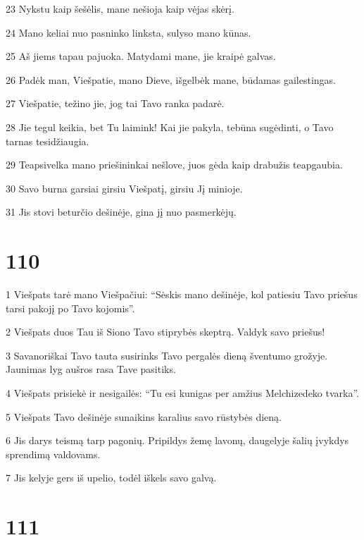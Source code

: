 \par 23 Nykstu kaip šešėlis, mane nešioja kaip vėjas skėrį. 
\par 24 Mano keliai nuo pasninko linksta, sulyso mano kūnas. 
\par 25 Aš jiems tapau pajuoka. Matydami mane, jie kraipė galvas. 
\par 26 Padėk man, Viešpatie, mano Dieve, išgelbėk mane, būdamas gailestingas. 
\par 27 Viešpatie, težino jie, jog tai Tavo ranka padarė. 
\par 28 Jie tegul keikia, bet Tu laimink! Kai jie pakyla, tebūna sugėdinti, o Tavo tarnas tesidžiaugia. 
\par 29 Teapsivelka mano priešininkai nešlove, juos gėda kaip drabužis teapgaubia. 
\par 30 Savo burna garsiai girsiu Viešpatį, girsiu Jį minioje. 
\par 31 Jis stovi beturčio dešinėje, gina jį nuo pasmerkėjų.


\chapter{110}


\par 1 Viešpats tarė mano Viešpačiui: “Sėskis mano dešinėje, kol patiesiu Tavo priešus tarsi pakojį po Tavo kojomis”. 
\par 2 Viešpats duos Tau iš Siono Tavo stiprybės skeptrą. Valdyk savo priešus! 
\par 3 Savanoriškai Tavo tauta susirinks Tavo pergalės dieną šventumo grožyje. Jaunimas lyg aušros rasa Tave pasitiks. 
\par 4 Viešpats prisiekė ir nesigailės: “Tu esi kunigas per amžius Melchizedeko tvarka”. 
\par 5 Viešpats Tavo dešinėje sunaikins karalius savo rūstybės dieną. 
\par 6 Jis darys teismą tarp pagonių. Pripildys žemę lavonų, daugelyje šalių įvykdys sprendimą valdovams. 
\par 7 Jis kelyje gers iš upelio, todėl iškels savo galvą.


\chapter{111}


